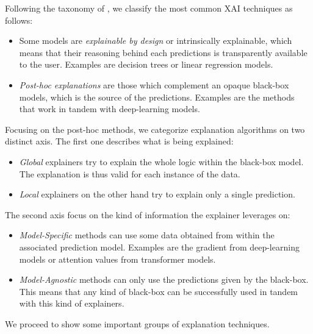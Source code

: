 \documentclass[]{marticle}
\begin{document}
Following the taxonomy of \cite{xai-survey}, we classify the most common XAI techniques as follows:

\begin{itemize}
\item Some models are \textit{explainable by design} or intrinsically explainable, which means that
    their reasoning behind each predictions is transparently available to the user. Examples are
    decision trees or linear regression models.

\item \textit{Post-hoc explanations} are those which complement an opaque black-box models, which is
    the source of the predictions. Examples are the methods that work in tandem with deep-learning
    models.
\end{itemize}

Focusing on the post-hoc methods, we categorize explanation algorithms on two distinct axis. The
first one describes what is being explained:
\begin{itemize}
\item \textit{Global} explainers try to explain the whole logic within the black-box model. The
    explanation is thus valid for each instance of the data.

\item \textit{Local} explainers on the other hand try to explain only a single prediction.
\end{itemize}

The second axis focus on the kind of information the explainer leverages on:
\begin{itemize}
\item \textit{Model-Specific} methods can use some data obtained from within the associated
    prediction model. Examples are the gradient from deep-learning models or attention values from
    transformer models.

\item \textit{Model-Agnostic} methods can only use the predictions given by the black-box. This
    means that any kind of black-box can be successfully used in tandem with this kind of
    explainers.
\end{itemize}

We proceed to show some important groups of explanation techniques.
\end{document}
